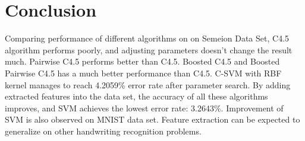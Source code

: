 \documentclass[a4paper,11pt]{article}
\begin{document}
\section{Conclusion}
Comparing performance of different algorithms on on Semeion Data Set, C4.5 algorithm performs poorly, and adjusting parameters doesn't change the result much. Pairwise C4.5 performs better than C4.5. Boosted C4.5 and Boosted Pairwise C4.5 has a much better performance than C4.5. C-SVM with RBF kernel manages to reach 4.2059\% error rate after parameter search. By adding extracted features into the data set, the accuracy of all these algorithms improves, and SVM achieves the lowest error rate: 3.2643\%. Improvement of SVM is also observed on MNIST data set. Feature extraction can be expected to generalize on other handwriting recognition problems.

\newpage


\end{document}
